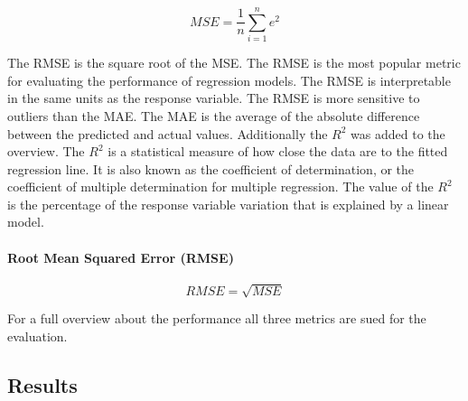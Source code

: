 \begin{equation}
    \label{eq:mse}
    MSE = \frac{1}{n} \sum_{i=1}^{n} e^2
\end{equation}

The RMSE is the square root of the MSE. The RMSE is the most popular metric for evaluating the
performance of regression models. The RMSE is interpretable in the same units as the response
variable. The RMSE is more sensitive to outliers than the MAE.
The MAE is the average of the absolute difference between the predicted and actual values.
Additionally the $R^2$ was added to the overview. The $R^2$ is a statistical measure of how close
the data are to the fitted regression line. It is also known as the coefficient of determination,
or the coefficient of multiple determination for multiple regression. The value of the $R^2$ is
the percentage of the response variable variation that is explained by a linear model.

\paragraph*{Root Mean Squared Error (RMSE)}

\begin{equation}
    \label{eq:rmse}
    RMSE = \sqrt{MSE}
\end{equation}

For a full overview about the performance all three metrics are sued for the evaluation.




\subsection{Results}\label{subsec:results}

